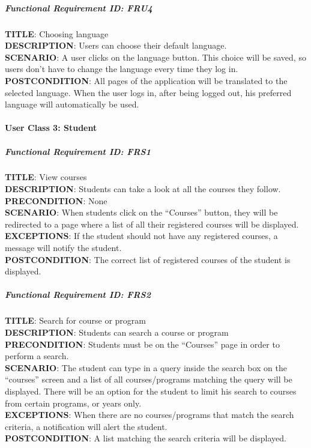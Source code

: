 \documentclass[12pt]{article}
\begin{document}
\subparagraph{Functional Requirement \textbf{ID}:
FRU4}\label{functional-requirement-id-fru4}

\textbf{TITLE}: Choosing language\\\textbf{DESCRIPTION}: Users can
choose their default language.\\\textbf{SCENARIO}: A user clicks on the
language button. This choice will be saved, so users don't have to
change the language every time they log in.\\\textbf{POSTCONDITION}: All
pages of the application will be translated to the selected language.
When the user logs in, after being logged out, his preferred language
will automatically be used.

\paragraph{User Class 3: Student}\label{user-class-3-student}

\subparagraph{Functional Requirement \textbf{ID}:
FRS1}\label{functional-requirement-id-frs1}

\textbf{TITLE}: View courses\\\textbf{DESCRIPTION}: Students can take a
look at all the courses they follow.\\\textbf{PRECONDITION}:
None\\\textbf{SCENARIO}: When students click on the ``Courses'' button,
they will be redirected to a page where a list of all their registered
courses will be displayed.\\\textbf{EXCEPTIONS}: If the student should
not have any registered courses, a message will notify the
student.\\\textbf{POSTCONDITION}: The correct list of registered courses
of the student is displayed.

\subparagraph{Functional Requirement \textbf{ID}:
FRS2}\label{functional-requirement-id-frs2}

\textbf{TITLE}: Search for course or program\\\textbf{DESCRIPTION}:
Students can search a course or program\\\textbf{PRECONDITION}: Students
must be on the ``Courses'' page in order to perform a
search.\\\textbf{SCENARIO}: The student can type in a query inside the
search box on the ``courses'' screen and a list of all courses/programs
matching the query will be displayed. There will be an option for the
student to limit his search to courses from certain programs, or years
only.\\\textbf{EXCEPTIONS}: When there are no courses/programs that
match the search criteria, a notification will alert the
student.\\\textbf{POSTCONDITION}: A list matching the search criteria
will be displayed.
\end{document}
